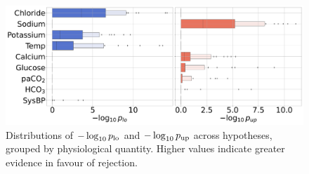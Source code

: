 

\begin{figure}[t]
    \centering
    \includegraphics[height=4.5cm]{figures/causal/latest_experimental_results/p_values_nogray.pdf}
    \caption{Distributions of $-\log_{10}{p_\textup{lo}}$ and $-\log_{10}{p_\textup{up}}$ across hypotheses, grouped by physiological quantity. Higher values indicate greater evidence in favour of rejection.}
    \label{fig:p_values}
\end{figure}



